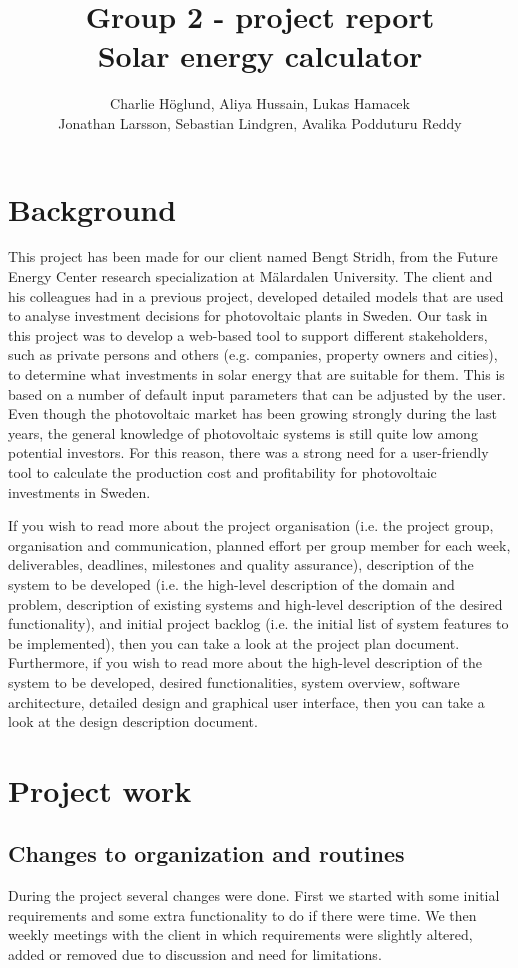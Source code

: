 \documentclass[]{article}
\title{Group 2 - project report \\Solar energy calculator}
\author{Charlie Höglund, Aliya Hussain, Lukas Hamacek
		\\Jonathan Larsson, Sebastian Lindgren, Avalika Podduturu Reddy}
\begin{document}
\maketitle
\clearpage
\tableofcontents
\listoftables
\clearpage

\section{Background}
This project has been made for our client named Bengt Stridh, from the Future Energy Center research specialization at Mälardalen University. The client and his colleagues had in a previous project, developed detailed models that are used to analyse investment decisions for photovoltaic plants in Sweden. Our task in this project was to develop a web-based tool to support different stakeholders, such as private persons and others (e.g. companies, property owners and cities), to determine what investments in solar energy that are suitable for them. This is based on a number of default input parameters that can be adjusted by the user. Even though the photovoltaic market has been growing strongly during the last years, the general knowledge of photovoltaic systems is still quite low among potential investors. For this reason, there was a strong need for a user-friendly tool to calculate the production cost and profitability for photovoltaic investments in Sweden.

If you wish to read more about the project organisation (i.e. the project group, organisation and communication, planned effort per group member for each week, deliverables, deadlines, milestones and quality assurance), description of the system to be developed (i.e. the high-level description of the domain and problem, description of existing systems and high-level description of the desired functionality), and initial project backlog (i.e. the initial list of system features to be implemented), then you can take a look at the project plan document. Furthermore, if you wish to read more about the high-level description of the system to be developed, desired functionalities, system overview, software architecture, detailed design and graphical user interface, then you can take a look at the design description document. 

\section{Project work}

\subsection{Changes to organization and routines}
During the project several changes were done. First we started with some initial requirements and some extra functionality to do if there were time. We then weekly meetings with the client in which requirements were slightly altered, added or removed due to discussion and need for limitations.
\end{document}
